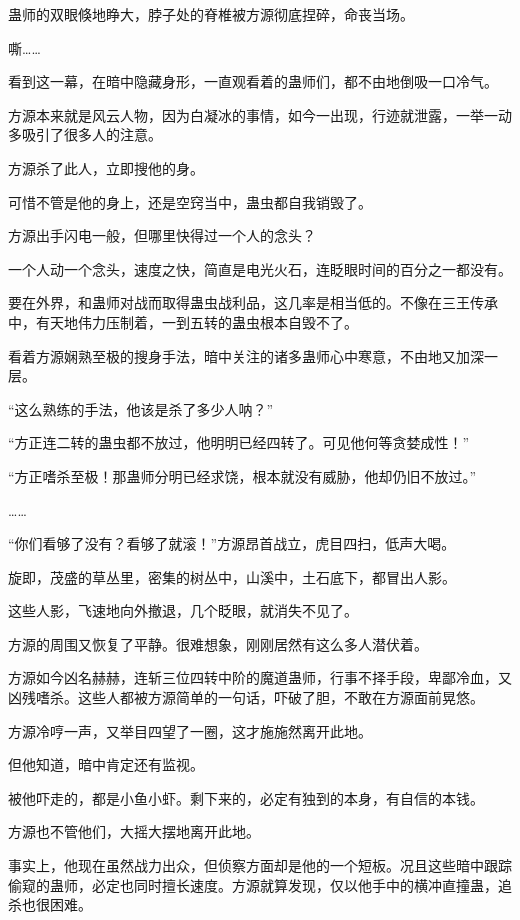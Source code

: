 \begin{this_body}
蛊师的双眼倏地睁大，脖子处的脊椎被方源彻底捏碎，命丧当场。

嘶……

看到这一幕，在暗中隐藏身形，一直观看着的蛊师们，都不由地倒吸一口冷气。

方源本来就是风云人物，因为白凝冰的事情，如今一出现，行迹就泄露，一举一动多吸引了很多人的注意。

方源杀了此人，立即搜他的身。

可惜不管是他的身上，还是空窍当中，蛊虫都自我销毁了。

方源出手闪电一般，但哪里快得过一个人的念头？

一个人动一个念头，速度之快，简直是电光火石，连眨眼时间的百分之一都没有。

要在外界，和蛊师对战而取得蛊虫战利品，这几率是相当低的。不像在三王传承中，有天地伟力压制着，一到五转的蛊虫根本自毁不了。

看着方源娴熟至极的搜身手法，暗中关注的诸多蛊师心中寒意，不由地又加深一层。

“这么熟练的手法，他该是杀了多少人呐？”

“方正连二转的蛊虫都不放过，他明明已经四转了。可见他何等贪婪成性！”

“方正嗜杀至极！那蛊师分明已经求饶，根本就没有威胁，他却仍旧不放过。”

……

“你们看够了没有？看够了就滚！”方源昂首战立，虎目四扫，低声大喝。

旋即，茂盛的草丛里，密集的树丛中，山溪中，土石底下，都冒出人影。

这些人影，飞速地向外撤退，几个眨眼，就消失不见了。

方源的周围又恢复了平静。很难想象，刚刚居然有这么多人潜伏着。

方源如今凶名赫赫，连斩三位四转中阶的魔道蛊师，行事不择手段，卑鄙冷血，又凶残嗜杀。这些人都被方源简单的一句话，吓破了胆，不敢在方源面前晃悠。

方源冷哼一声，又举目四望了一圈，这才施施然离开此地。

但他知道，暗中肯定还有监视。

被他吓走的，都是小鱼小虾。剩下来的，必定有独到的本身，有自信的本钱。

方源也不管他们，大摇大摆地离开此地。

事实上，他现在虽然战力出众，但侦察方面却是他的一个短板。况且这些暗中跟踪偷窥的蛊师，必定也同时擅长速度。方源就算发现，仅以他手中的横冲直撞蛊，追杀也很困难。


\end{this_body}

